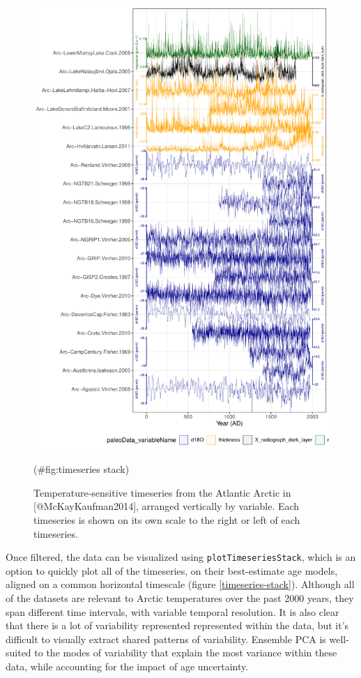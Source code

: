 \documentclass[gchron, manuscript]{copernicus}
\begin{document}
\begin{figure}
\includegraphics[width=12cm]{geoChronR-paper_files/figure-latex/timeseries stack-1} \caption{Temperature-sensitive timeseries from the Atlantic Arctic in [@McKayKaufman2014], arranged vertically by variable. Each timeseries is shown on its own scale to the right or left of each timeseries.}(\#fig:timeseries stack)
\end{figure}

Once filtered, the data can be visualized using \texttt{plotTimeseriesStack}, which is an option to quickly plot all of the timeseries, on their best-estimate age models, aligned on a common horizontal timescale (figure \ref{timeseries-stack}).
Although all of the datasets are relevant to Arctic temperatures over the past 2000 years, they span different time intervals, with variable temporal resolution.
It is also clear that there is a lot of variability represented represented within the data, but it's difficult to visually extract shared patterns of variability.
Ensemble PCA is well-suited to the modes of variability that explain the most variance within these data, while accounting for the impact of age uncertainty.
\end{document}
